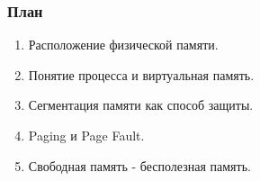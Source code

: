 \begin{frame}
\frametitle{План}

\begin{enumerate}
  \item Расположение физической памяти.
  \item Понятие процесса и виртуальная память.
  \item Сегментация памяти как способ защиты.
  \item Paging и Page Fault.
  \item Свободная память - бесполезная память.
\end{enumerate}
\end{frame}
